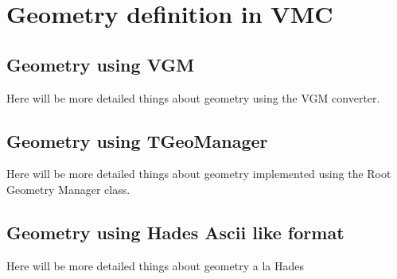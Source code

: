 \chapter{Geometry definition in VMC}
\label{chap:appendix1}

\section{Geometry using VGM}

Here will be more detailed things  about geometry
using the VGM converter.

\section{Geometry using TGeoManager}

Here will be more detailed things  about geometry 
implemented using the Root Geometry Manager class.

\section{Geometry using Hades Ascii like format}

Here will be more detailed things  about geometry 
a la Hades
